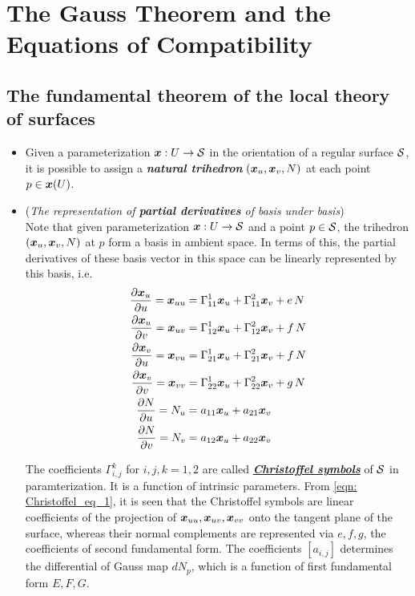 \documentclass[11pt]{article}
\begin{document}
\section{The Gauss Theorem and the Equations of Compatibility}
\subsection{The fundamental theorem of the local theory of surfaces}
\begin{itemize}
\item Given a parameterization $\boldsymbol{x}: U\rightarrow {\mathcal S}$ in the orientation of a regular surface ${\mathcal S}$, it is possible to assign a \emph{\textbf{natural trihedron}} $(\boldsymbol{x}_{u}, \boldsymbol{x}_{v}, N)$ at each point $p\in \boldsymbol{x}(U)$. 

\item (\emph{The representation of \textbf{partial derivatives} of basis under basis})\\
Note that given parameterization $\boldsymbol{x}: U \rightarrow {\mathcal S}$ and a point $p\in {\mathcal S}$, the trihedron $(\boldsymbol{x}_{u}, \boldsymbol{x}_{v}, N)$ at $p$ form a basis in ambient space. In terms of this, the partial derivatives of these basis vector in this space can be linearly represented by this basis, i.e. 
\begin{align}
\frac{\partial \boldsymbol{x}_{u}}{ \partial u} = \boldsymbol{x}_{uu} &= \Gamma_{11}^{1}\boldsymbol{x}_{u} +  \Gamma_{11}^{2}\boldsymbol{x}_{v} + e\,N\nonumber\\
\frac{\partial \boldsymbol{x}_{u}}{ \partial v} = \boldsymbol{x}_{uv} &= \Gamma_{12}^{1}\boldsymbol{x}_{u} +  \Gamma_{12}^{2}\boldsymbol{x}_{v} + f\,N\nonumber\\
\frac{\partial \boldsymbol{x}_{v}}{ \partial u} = \boldsymbol{x}_{vu} &= \Gamma_{21}^{1}\boldsymbol{x}_{u} +  \Gamma_{21}^{2}\boldsymbol{x}_{v} + f\,N\nonumber\\
\frac{\partial \boldsymbol{x}_{v}}{ \partial v} = \boldsymbol{x}_{vv} &= \Gamma_{22}^{1}\boldsymbol{x}_{u} +  \Gamma_{22}^{2}\boldsymbol{x}_{v} + g\,N\nonumber\\
\frac{\partial N}{ \partial u} =N_{u} &= a_{11}\boldsymbol{x}_{u} +  a_{21}\boldsymbol{x}_{v} \nonumber\\
\frac{\partial N}{ \partial v} =N_{v} &= a_{12}\boldsymbol{x}_{u} +  a_{22}\boldsymbol{x}_{v} \label{eqn: Christoffel_eq_1}
\end{align}

The coefficients $\Gamma_{i,j}^{k}$ for $i,j,k = 1,2$ are called \underline{\emph{\textbf{Christoffel symbols}}} of ${\mathcal S}$ in paramterization. It is  a function of intrinsic parameters. From \eqref{eqn: Christoffel_eq_1}, it is seen that the Christoffel symbols are linear coefficients of the projection of $\boldsymbol{x}_{uu}, \boldsymbol{x}_{uv}, \boldsymbol{x}_{vv}$ onto the tangent plane of the surface, whereas their normal complements are represented via $e,f,g$, the coefficients of second fundamental form. The coefficients $[a_{i,j}]$ determines the differential of Gauss map $dN_{p}$, which is a function of first fundamental form $E,F,G$. 


\end{itemize}
\end{document}

